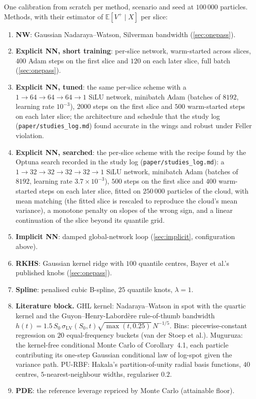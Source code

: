 \documentclass[11pt,a4paper]{article}
\newcommand{\E}{\mathbb{E}}
\newcommand{\code}[1]{\texttt{#1}}
\begin{document}
One calibration from scratch per method, scenario and seed at $100\,000$ particles. Methods, with their estimator of $\E[V^+\mid X]$ per slice:
\begin{enumerate}
\item \textbf{NW}: Gaussian Nadaraya--Watson, Silverman bandwidth (\cref{sec:onepass}).
\item \textbf{Explicit NN, short training}: per-slice network, warm-started across slices, $400$ Adam steps on the first slice and $120$ on each later slice, full batch (\cref{sec:onepass}).
\item \textbf{Explicit NN, tuned}: the same per-slice scheme with a $1\to64\to64\to64\to1$ SiLU network, minibatch Adam (batches of $8192$, learning rate $10^{-3}$), $2000$ steps on the first slice and $500$ warm-started steps on each later slice; the architecture and schedule that the study log (\code{paper/studies\_log.md}) found accurate in the wings and robust under Feller violation.
\item \textbf{Explicit NN, searched}: the per-slice scheme with the recipe found by the Optuna search recorded in the study log (\code{paper/studies\_log.md}): a $1\to32\to32\to32\to32\to1$ SiLU network, minibatch Adam (batches of $8192$, learning rate $3.7\times10^{-3}$), $500$ steps on the first slice and $400$ warm-started steps on each later slice, fitted on $250\,000$ particles of the cloud, with mean matching (the fitted slice is rescaled to reproduce the cloud's mean variance), a monotone penalty on slopes of the wrong sign, and a linear continuation of the slice beyond its quantile grid.
\item \textbf{Implicit NN}: damped global-network loop (\cref{sec:implicit}, configuration above).
\item \textbf{RKHS}: Gaussian kernel ridge with $100$ quantile centres, Bayer et al.'s published knobs (\cref{sec:onepass}).
\item \textbf{Spline}: penalised cubic B-spline, $25$ quantile knots, $\lambda=1$.
\item \textbf{Literature block.} GHL kernel: Nadaraya--Watson in spot with the quartic kernel and the Guyon--Henry-Labord\`ere rule-of-thumb bandwidth $h(t)=1.5\,S_0\,\sigma_{\mathrm{LV}}(S_0,t)\sqrt{\max(t,0.25)}\,N^{-1/5}$. Bins: piecewise-constant regression on $20$ equal-frequency buckets (van der Stoep et al.). Muguruza: the kernel-free conditional Monte Carlo of Corollary~4.1, each particle contributing its one-step Gaussian conditional law of log-spot given the variance path. PU-RBF: Hakala's partition-of-unity radial basis functions, $40$ centres, $5$-nearest-neighbour widths, regulariser $0.2$.
\item \textbf{PDE}: the reference leverage repriced by Monte Carlo (attainable floor).
\end{enumerate}
\end{document}
